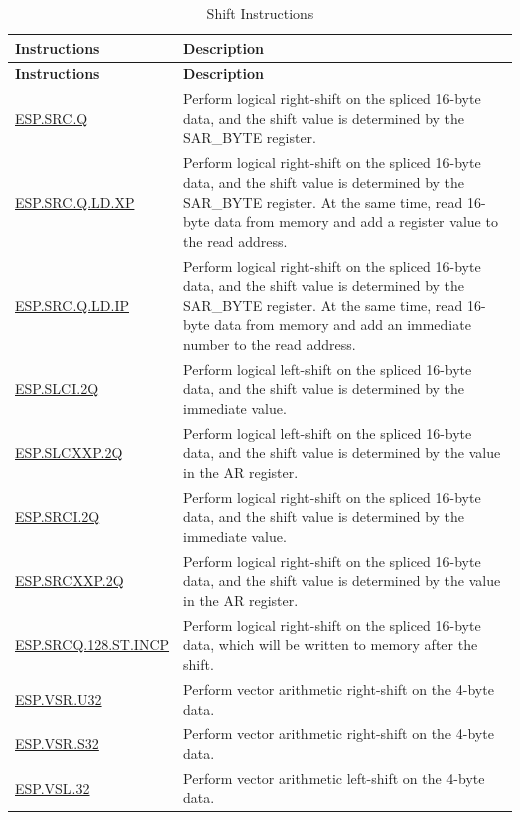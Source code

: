 \begin{longtable}[c]{|l|m{11cm}|}
    \caption{Shift Instructions}
    \label{tab:pie-shift-instructions}\\
    \hline
    \rowcolor{lightgray}
    \textbf{Instructions} & \textbf{Description} \\\hline
    \endfirsthead
    \rowcolor{lightgray}
    \textbf{Instructions} & \textbf{Description} \\\hline
    \endhead
    \endfoot
    
    \hyperref[instruction:ESPSRCQ]{ESP.SRC.Q} & Perform logical right-shift on the spliced 16-byte data, and the shift value is determined by the SAR\_BYTE register.
    \\\hline
    \hyperref[instruction:ESPSRCQLDXP]{ESP.SRC.Q.LD.XP} & Perform logical right-shift on the spliced 16-byte data, and the shift value is determined by the SAR\_BYTE register. At the same time, read 16-byte data from memory and add a register value to the read address.
    \\\hline
    \hyperref[instruction:ESPSRCQLDIP]{ESP.SRC.Q.LD.IP} & Perform logical right-shift on the spliced 16-byte data, and the shift value is determined by the SAR\_BYTE register. At the same time, read 16-byte data from memory and add an immediate number to the read address.
    \\\hline
    \hyperref[instruction:ESPSLCI2Q]{ESP.SLCI.2Q} & Perform logical left-shift on the spliced 16-byte data, and the shift value is determined by the immediate value.
    \\\hline
    \hyperref[instruction:ESPSLCXXP2Q]{ESP.SLCXXP.2Q} & Perform logical left-shift on the spliced 16-byte data, and the shift value is determined by the value in the AR register.
    \\\hline
    \hyperref[instruction:ESPSRCI2Q]{ESP.SRCI.2Q} & Perform logical right-shift on the spliced 16-byte data, and the shift value is determined by the immediate value.
    \\\hline
    \hyperref[instruction:ESPSRCXXP2Q]{ESP.SRCXXP.2Q} & Perform logical right-shift on the spliced 16-byte data, and the shift value is determined by the value in the AR register.
    \\\hline
    \hyperref[instruction:ESPSRCQ128STINCP]{ESP.SRCQ.128.ST.INCP} & Perform logical right-shift on the spliced 16-byte data, which will be written to memory after the shift.
    \\\hline
    \hyperref[instruction:ESPVSRU32]{ESP.VSR.U32} & Perform vector arithmetic right-shift on the 4-byte data.
    \\\hline
       \hyperref[instruction:ESPVSRS32]{ESP.VSR.S32} & Perform vector arithmetic right-shift on the 4-byte data.
    \\\hline
    \hyperref[instruction:ESPVSL32]{ESP.VSL.32} & Perform vector arithmetic left-shift on the 4-byte data.
    \\\hline


\end{longtable}

